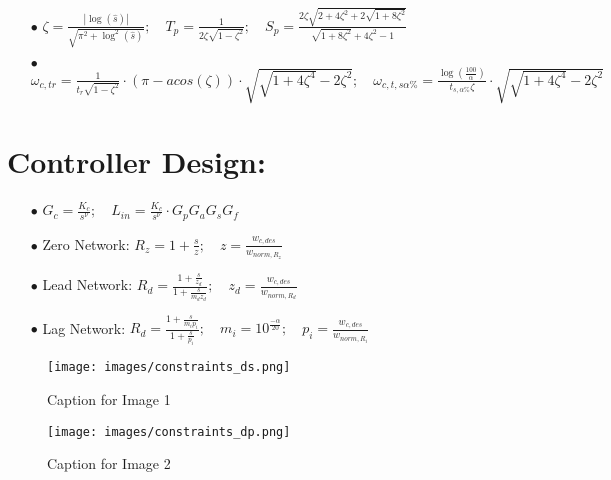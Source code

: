 \documentclass{article}
\begin{document}
\begin{enumerate}
		\item[$\bullet$] $ \zeta = \frac{\left| \log (\hat{s}) \right|}{\sqrt{\pi^2 + \log^2 (\hat{s})}}; \quad 
		T_p = \frac{1}{2\zeta \sqrt{1-\zeta^2}}; \quad
		S_p = \frac{2\zeta \sqrt{2+4\zeta^2+2\sqrt{1+8\zeta^2}}}{\sqrt{1+8\zeta^2}+4\zeta^2-1}$
		
		\item[$\bullet$] $ \omega_{c,tr} = \frac{1}{t_r\sqrt{1-\zeta^2}} \cdot
		(\pi - acos(\zeta)) \cdot \sqrt{\sqrt{1+4\zeta^4}-2\zeta^2}; \quad
		\omega_{c,t,s\alpha \%} = \frac{\log(\frac{100}{\alpha})}{t_{s,\alpha \%}\zeta} \cdot \sqrt{\sqrt{1+4\zeta^4}-2\zeta^2} $
		
	\end{enumerate}
	\newpage
	\section{Controller Design:}
	\begin{enumerate}
		\item[$\bullet$] $ G_c = \frac{K_c}{s^\nu}; \quad
		L_{in} = \frac{K_c}{s^\nu} \cdot G_pG_aG_sG_f $
		
		\item[$\bullet$] Zero Network: $ R_z = 1 + \frac{s}{z}; \quad
		z = \frac{w_{c,des}}{w_{norm,R_z}} $
		
		\item[$\bullet$] Lead Network: $ R_d = \frac{1 + \frac{s}{z_d}}{1 + \frac{s}{m_dz_d}}; \quad
		z_d = \frac{w_{c,des}}{w_{norm,R_d}} $
		
		\item[$\bullet$] Lag Network: $ R_d = \frac{1 + \frac{s}{m_ip_i}}{1 + \frac{s}{p_i}}; \quad
		m_i = 10^{\frac{-\alpha}{20}}; \quad
		p_i = \frac{w_{c,des}}{w_{norm,R_i}} $
		
	\end{enumerate}
	
	\begin{figure}[htbp]
		\centering
		\begin{minipage}{0.45\textwidth} %
			\centering
			\texttt{[image: images/constraints\_ds.png]} %
			\caption{Caption for Image 1}
			\label{fig:image1}
		\end{minipage}
		\hfill %
		\vrule width 0.5pt %
		\hfill %
		\begin{minipage}{0.45\textwidth} %
			\centering
			\texttt{[image: images/constraints\_dp.png]} %
			\caption{Caption for Image 2}
			\label{fig:image2}
		\end{minipage}
	\end{figure}
	
	
\end{document}
